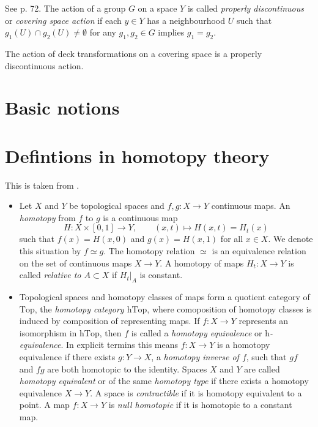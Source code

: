 \begin{definition}
\label{definition-prope-disco-actio}
See \cite{hat} p. 72. The action of a group
$G$ on a space $Y$ is called
{\it properly discontinuous} or {\it covering
space action} if each $y \in Y$
has a neighbourhood $U$ such that $g_1(U)
\cap g_2(U)\neq \emptyset$ for any
$g_1,g_2 \in G$ implies $g_1=g_2$.
\end{definition}

\begin{proposition}
\label{proposition-deck-trans-act-prope}
The action of deck transformations on a
covering space is a properly
discontinuous action.
\end{proposition}

\section{Basic notions}
\label{sec:Basic notions}

\section{Defintions in homotopy theory}
\label{section-defin-homot-theor}

This is taken from \cite{TomDieck}.

\begin{itemize}
\item Let $X$ and $Y$ be topological spaces
and
 $f,g:X\to Y$ continuous maps.
An {\it homotopy} from $f$ to $g$ is a
continuous map
$$
H:X\times[0,1]\to Y,\qquad(x,t)\mapsto
H(x,t)=H_t(x)
$$
\noindent
such that $f(x)=H(x,0)$ and $g(x)=H(x,1)$ for
all $x\in X$.
We denote this situation by $f\simeq g$.
The homotopy relation $\simeq$ is an
equivalence relation
on the set of continuous maps $X\to Y$.
A homotopy of maps $H_t:X\to Y$ is called
{\it relative to $A\subset X$} if $H_t|_A$ is
constant.


\item Topological spaces and homotopy classes
of maps form a quotient category
of $\text{Top}$, the {\it homotopy category
$\text{hTop}$}, where comoposition
of homotopy classes is induced by composition
of representing maps. If $f:X\to
Y$ represents an isomorphism in
$\text{hTop}$, then $f$ is called a
{\it homotopy equivalence} or
{\it $\text{h}$-equivalence}. In explicit
termins this means $f:X\to
Y$ is a homotopy equivalence if there exists
$g:Y\to X$, a
{\it homotopy inverse of $f$}, such that $gf$
and $fg$ are both
homotopic to the identity. Spaces $X$ and $Y$
are called
{\it homotopy equivalent} or of the same {\it
homotopy
type} if there exists a homotopy equivalence
$X\to Y$. A space is
{\it contractible} if it is homotopy
equivalent to a point. A map
$f:X\to Y$ is {\it null homotopic} if it is
homotopic to a constant
map.

\end{itemize}

